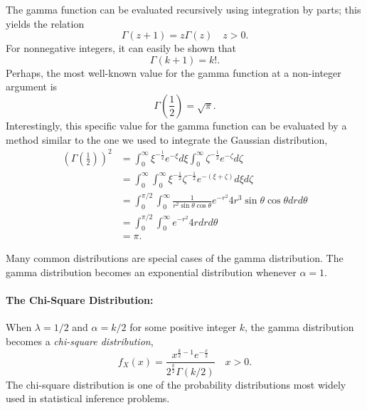 The gamma function can be evaluated recursively using integration by parts; this yields the relation
\begin{equation*}
\Gamma (z+1) = z \Gamma (z) \quad z > 0.
\end{equation*}
For nonnegative integers, it can easily be shown that
\begin{equation*}
\Gamma (k + 1) = k! .
\end{equation*}
Perhaps, the most well-known value for the gamma function at a non-integer argument is
\begin{equation*}
\Gamma \left( \frac{1}{2} \right)
= \sqrt{\pi} .
\end{equation*}
Interestingly, this specific value for the gamma function can be evaluated by a method similar to the one we used to integrate the Gaussian distribution,
\begin{equation*}
\begin{split}
\left( \Gamma \left( \frac{1}{2} \right) \right)^2
&= \int_0^{\infty} \xi^{-\frac{1}{2}} e^{-\xi} d\xi
\int_0^{\infty} \zeta^{-\frac{1}{2}} e^{-\zeta} d\zeta \\
&= \int_0^{\infty} \int_0^{\infty}
\xi^{-\frac{1}{2}} \zeta^{-\frac{1}{2}} e^{-(\xi + \zeta)}
d\xi d\zeta \\
&= \int_0^{\pi / 2} \int_0^{\infty}
\frac{1}{r^2 \sin \theta \cos \theta} e^{-r^2}
4 r^3 \sin \theta \cos \theta dr d\theta \\
&= \int_0^{\pi / 2} \int_0^{\infty}
 e^{-r^2} 4 r dr d\theta \\
&= \pi .
\end{split}
\end{equation*}

Many common distributions are special cases of the gamma distribution.
The gamma distribution becomes an exponential distribution whenever $\alpha = 1$.

\paragraph{The Chi-Square Distribution:}
When $\lambda = 1/2$ and $\alpha = k/2$ for some positive integer $k$, the gamma distribution becomes a \emph{chi-square distribution},
\begin{equation*}
f_X (x) = \frac{x^{\frac{k}{2} - 1} e^{-\frac{x}{2}}}{2^{\frac{k}{2}}\Gamma (k/2)} \quad  x > 0.
\end{equation*}
The chi-square distribution is one of the probability distributions most widely used in statistical inference problems.



